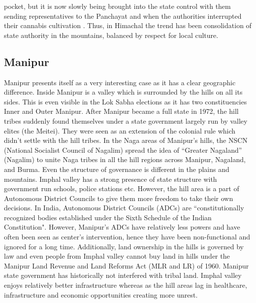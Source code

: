 \begin{sloppypar}
pocket, but it is now slowly being brought into the state control with them sending representatives to the Panchayat and when the authorities interrupted their cannabis cultivation \citep{axelby2015hermit}. Thus, in Himachal the trend has been consolidation of state authority in the mountains, balanced by respect for local culture.

\end{sloppypar}
\subsection{Manipur}

Manipur presents itself as a very interesting case as it has a clear geographic difference. Inside Manipur is a valley which is surrounded by the hills on all its sides. This is even visible in the Lok Sabha elections as it has two constituencies Inner and Outer Manipur. After Manipur became a full state in 1972, the hill tribes suddenly found themselves under a state government largely run by valley elites (the Meitei). They were seen as an extension of the colonial rule which didn't settle with the hill tribes.  In the Naga areas of Manipur's hills, the NSCN (National Socialist Council of Nagalim) spread the idea of ``Greater Nagaland” (Nagalim) to unite Naga tribes in all the hill regions across Manipur, Nagaland, and Burma. Even the structure of governance is different in the plains and mountains. Imphal valley has a strong presence of state structure with government run schools, police stations etc. However, the hill area is a part of Autonomous District Councils to give them more freedom to take their own decisions. In India, Autonomous District Councils (ADCs) are ``constitutionally recognized bodies established under the Sixth Schedule of the Indian Constitution". However, Manipur’s ADCs have relatively less powers and have often been seen as center's intervention, hence they have been non-functional and ignored for a long time. Additionally, land ownership in the hills is governed by law and even people from Imphal valley cannot buy land in hills under the  Manipur Land Revenue and Land Reforms Act (MLR and LR) of 1960. Manipur state government has historically not interfered with tribal land. 
Imphal valley enjoys relatively better infrastructure whereas as the hill areas lag in healthcare, infrastructure and economic opportunities creating more unrest. \citep{lacina2009problem}

